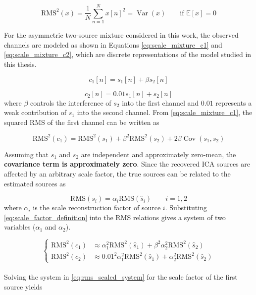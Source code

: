 \begin{equation}
\mathrm{RMS}^2(x)
=
\frac{1}{N}\sum_{n=1}^{N}x[n]^2
=
\operatorname{Var}(x)
\qquad \text{if } \mathbb{E}[x]=0
\label{eq:rms_definition}
\end{equation}

For the asymmetric two-source mixture considered in this work, the observed channels are modeled as shown in Equations \ref{eq:scale_mixture_c1} and \ref{eq:scale_mixture_c2}, which are discrete representations of the model studied in this thesis.

\begin{equation}
c_1[n]=s_1[n]+\beta s_2[n]
\label{eq:scale_mixture_c1}
\end{equation}

\begin{equation}
c_2[n]=0.01s_1[n]+s_2[n]
\label{eq:scale_mixture_c2}
\end{equation}
where $\beta$ controls the interference of $s_2$ into the first channel and $0.01$ represents a weak contribution of $s_1$ into the second channel. From \ref{eq:scale_mixture_c1}, the squared RMS of the first channel can be written as 

\begin{equation}
\mathrm{RMS}^2(c_1)
=
\mathrm{RMS}^2(s_1)
+
\beta^2\mathrm{RMS}^2(s_2)
+
2\beta\operatorname{Cov}(s_1,s_2)
\label{eq:rms_c1_full}
\end{equation}

Assuming that $s_1$ and $s_2$ are independent and approximately zero-mean, the \textbf{covariance term is approximately zero}. Since the recovered ICA sources are affected by an arbitrary scale factor, the true sources can be related to the estimated sources as

\begin{equation}
\mathrm{RMS}(s_i)=\alpha_i\mathrm{RMS}(\hat{s}_i)
\qquad i=1,2
\label{eq:scale_factor_definition}
\end{equation}
where $\alpha_i$ is the scale reconstruction factor of source $i$. Substituting \ref{eq:scale_factor_definition} into the RMS relations gives a system of two variables ($\alpha_1$ and $\alpha_2$).

\begin{equation}
\left\{
\begin{aligned}
\mathrm{RMS}^2(c_1)
&\approx
\alpha_1^2\mathrm{RMS}^2(\hat{s}_1)
+
\beta^2\alpha_2^2\mathrm{RMS}^2(\hat{s}_2)
\\[0.4em]
\mathrm{RMS}^2(c_2)
&\approx
0.01^2\alpha_1^2\mathrm{RMS}^2(\hat{s}_1)
+
\alpha_2^2\mathrm{RMS}^2(\hat{s}_2)
\end{aligned}
\right.
\label{eq:rms_scaled_system}
\end{equation}
\\
Solving the system in \ref{eq:rms_scaled_system} for the scale factor of the first source yields

